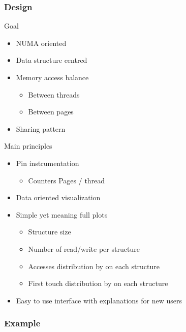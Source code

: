 \documentclass[xcolor={usenames,dvipsnames}]{beamer}
\makeatletter
\newcommand{\alertitem}{\item<+-|alert@+->}
\makeatother
\begin{document}
\subsubsection*{Design}
\begin{frame}{Goal}
    \begin{itemize}[<+->]
        \item NUMA oriented
        \item Data structure centred
        \item Memory access balance 
            \begin{itemize}
                \item Between threads
                \item Between pages
            \end{itemize}
        \item Sharing pattern
    \end{itemize}
\end{frame}

\begin{frame}{Main principles}
    \begin{itemize}[<+->]
        \item Pin instrumentation
            \begin{itemize}
                \item Counters Pages / thread
            \end{itemize}
        \item Data oriented visualization
        \item Simple yet meaning full plots
            \begin{itemize}
                \item Structure size
                \item Number of read/write per structure
                \alertitem Accesses distribution by on each structure
                \alertitem First touch distribution by on each structure
            \end{itemize}
        \item Easy to use interface with explanations for new users
    \end{itemize}
\end{frame}

\subsubsection*{Example}
\end{document}
